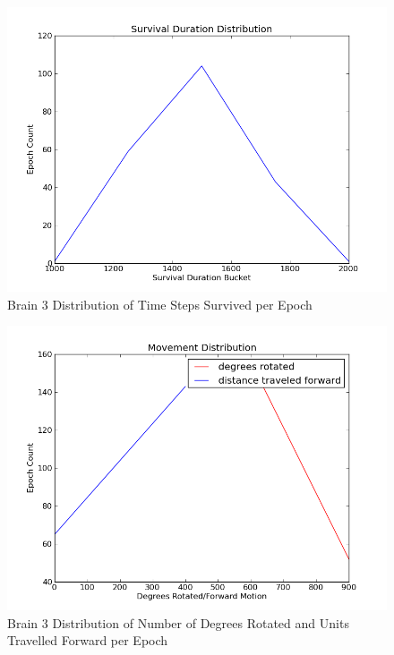 \documentclass[a4paper,11pt]{article}
\begin{document}
\begin{figure}
\begin{center}
  \includegraphics[scale=1.0]{img/brain3/survivalGauss-353.55.png}
  \caption{Brain 3 Distribution of Time Steps Survived per Epoch}
  \label{fig:b3survive}
\end{center}
\end{figure}

\begin{figure}
\begin{center}
  \includegraphics[scale=1.0]{img/brain3/travelGauss-r150.00-d200.00.png}
  \caption{Brain 3 Distribution of Number of Degrees Rotated and Units Travelled Forward per Epoch}
  \label{fig:b3travel}
\end{center}
\end{figure}
\end{document}
